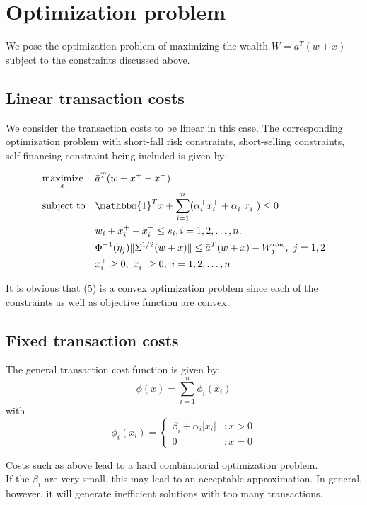 \documentclass[a4paper]{article}
\begin{document}
\section{Optimization problem}
We pose the optimization problem of maximizing the wealth $W=a^T(w+x)$ subject to the constraints discussed above.

\subsection{Linear transaction costs}
We consider the transaction costs to be linear in this case. The corresponding optimization problem with short-fall risk constraints, short-selling constraints, self-financing constraint being included is given by:


\begin{equation}
\begin{aligned}
& \underset{x}{\text{maximize}}
& & \bar{a}^T (w+x^+ - x^-) \\
& \text{subject to}
& & \mathbbm{1}^Tx + \displaystyle \sum_{i=1}^n (\alpha_i^{+}x_i^+ + \alpha_i^{-}x_i^-) \leq 0  \\
& & & w_i +x_i^+ - x_i^-   \leq  s_i,  i=1,2,\ldots,n.\\
& & & \Phi^{-1}(\eta_j)\|\Sigma^{1/2}(w+x)\| \leq \bar{a}^T(w+x)- W_j^{low}, \  j=1,2 \\
& & &   x_i^+ \geq 0,\ x_i^- \geq 0,\ i=1,2,\ldots,n   \\
\end{aligned}
\end{equation}

It is obvious that (5) is a convex optimization problem since each of the constraints as well as objective function are convex.


\subsection{Fixed transaction costs}

The general transaction cost function is given by:
$$
\phi(x)= \sum_{i=1}^n \phi_i(x_i)
$$
with
\[
 \phi_i(x_i) =
  \begin{cases}
   \beta_i + \alpha_i |x_i| & :  x > 0 \\
    0 &: x=0
  \end{cases}
\]

Costs such as above lead to a hard combinatorial optimization problem.\\

If the $\beta_i$ are very small, this may lead to an acceptable approximation. In general, however, it will generate inefficient solutions with too many transactions.\cite{2}
\end{document}
